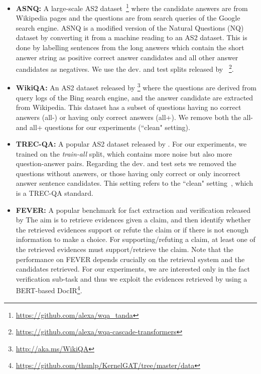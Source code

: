 \begin{itemize}[wide, labelwidth=!, labelindent=0pt]
    \item \textbf{ASNQ:} A large-scale AS2 dataset~\cite{garg2019tanda}\footnote{\url{https://github.com/alexa/wqa_tanda}} where the candidate answers are from Wikipedia pages and the questions are from search queries of the Google search engine. ASNQ is a modified version of the Natural Questions (NQ)~\cite{kwiatkowski-etal-2019-natural} dataset by converting it from a machine reading to an AS2 dataset. This is done by labelling sentences from the long answers which contain the short answer string as positive correct answer candidates and all other answer candidates as negatives. We use the dev. and test splits released by ~\citeauthor{soldaini-moschitti-2020-cascade}\footnote{\url{https://github.com/alexa/wqa-cascade-transformers}}.

    \item \textbf{WikiQA:} An  AS2 dataset released by \citeauthor{yang2015wikiqa}\footnote{\url{http://aka.ms/WikiQA}} where the questions are derived from query logs of the Bing search engine, and the answer candidate are extracted from Wikipedia. This dataset has a subset of questions having no correct answers (all-) or having only correct answers (all+). We remove both the all- and all+ questions for our experiments (``clean" setting).
    
    \item \textbf{TREC-QA:} A popular AS2 dataset released by \citeauthor{wang-etal-2007-jeopardy}. For our experiments, we trained on the \textit{train-all} split, which contains more noise but also more question-answer pairs. Regarding the dev. and test sets we removed the questions without answers, or those having only correct or only incorrect answer sentence candidates. This setting refers to the ``clean" setting~\cite{shen-etal-2017-inter}, which is a TREC-QA standard.
    
    \item \textbf{FEVER:} A popular benchmark for fact extraction and verification released by \citeauthor{thorne-etal-2018-fever} The aim is to retrieve evidences given a claim, and then identify whether the retrieved evidences support or refute the claim or if there is not enough information to make a choice. For supporting/refuting a claim, at least one of the retrieved evidences must support/retrieve the claim. Note that the performance on FEVER depends crucially on the retrieval system and the candidates retrieved. For our experiments, we are interested only in the fact verification sub-task and thus we exploit the evidences retrieved by \citeauthor{liu2020kernel} using a BERT-based DocIR\footnote{\url{https://github.com/thunlp/KernelGAT/tree/master/data}}.
    

\end{itemize}
